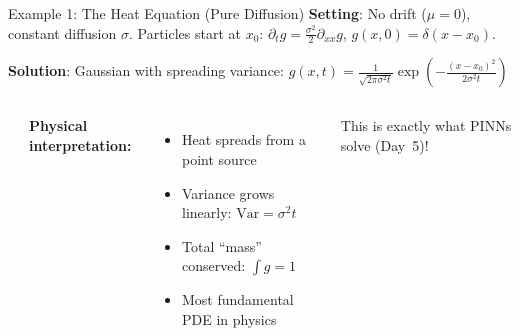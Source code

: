 \documentclass[aspectratio=169,11pt]{beamer}
\newcommand{\emphc}[1]{\textcolor{harvardcrimson}{#1}}
\begin{document}
\begin{frame}{Example 1: The Heat Equation (Pure Diffusion)}
\small
\textbf{Setting}: No drift ($\mu = 0$), constant diffusion $\sigma$. Particles start at $x_0$:
$\partial_t g = \frac{\sigma^2}{2}\partial_{xx}g$, \; $g(x,0) = \delta(x - x_0)$.

\textbf{Solution}: Gaussian with spreading variance:
$g(x,t) = \frac{1}{\sqrt{2\pi\sigma^2 t}}\exp\!\left(-\frac{(x-x_0)^2}{2\sigma^2 t}\right)$

\begin{columns}[T]
\begin{center}
\end{center}

\textbf{Physical interpretation:}
\begin{itemize}\itemsep1pt
    \item Heat spreads from a point source
    \item Variance grows linearly: $\text{Var} = \sigma^2 t$
    \item Total ``mass'' conserved: $\int g = 1$
    \item \emphc{Most fundamental PDE in physics}
\end{itemize}

\vspace{0.2em}
{\small This is exactly what PINNs solve (Day~5)!}
\end{columns}
\end{frame}
\end{document}
